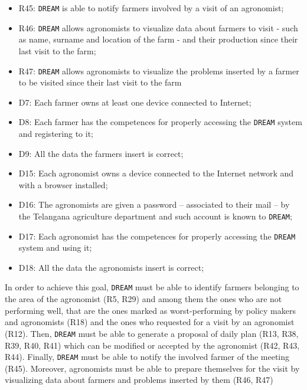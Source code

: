 \documentclass{article}
\begin{document}
\begin{itemize}
    \item R45: \verb|DREAM| is able to notify farmers involved by a visit of an agronomist;
    
    \item R46: \verb|DREAM| allows agronomists to visualize data about farmers to visit - such as name, surname and location of the farm -  and their production since their last visit to the farm;
    
    \item R47: \verb|DREAM| allows agronomists to visualize the problems inserted by a farmer to be visited since their last visit to the farm
    
    \item D7: Each farmer owns at least one device connected to Internet;
    
    \item D8: Each farmer has the competences for properly accessing the \verb|DREAM| system and registering to it;
    
    \item D9: All the data the farmers insert is correct;
    
    \item D15: Each agronomist owns a device connected to the Internet network and with a browser installed;

    \item D16: The agronomists are given a password – associated to their mail – by the Telangana agriculture department and such account is known to \verb|DREAM|;

    \item D17: Each agronomist has the competences for properly accessing the \verb|DREAM| system and using it;
  
    \item D18: All the data the agronomists insert is correct;
\end{itemize}
In order to achieve this goal, \verb|DREAM| must be able to identify farmers belonging to the area of the agronomist (R5, R29) and among them the ones who are not performing well, that are the ones marked as worst-performing by policy makers and agronomists (R18) and the ones who requested for a visit by an agronomist (R12). Then, \verb|DREAM| must be able to generate a proposal of daily plan (R13, R38, R39, R40, R41) which can be modified or accepted by the agronomist (R42, R43, R44). Finally, \verb|DREAM| must be able to notify the involved farmer of the meeting (R45). Moreover, agronomists must be able to prepare themselves for the visit by visualizing data about farmers and problems inserted by them (R46, R47)
\end{document}
